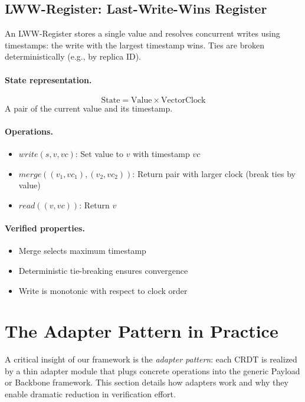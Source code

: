 \subsection{LWW-Register: Last-Write-Wins Register}

An LWW-Register stores a single value and resolves concurrent writes using timestamps: the write with the largest timestamp wins. Ties are broken deterministically (e.g., by replica ID).

\paragraph{State representation.}
\[
\text{State} = \text{Value} \times \text{VectorClock}
\]
A pair of the current value and its timestamp.

\paragraph{Operations.}
\begin{itemize}
  \item $\mathit{write}(s, v, vc)$: Set value to $v$ with timestamp $vc$
  \item $\mathit{merge}((v_1, vc_1), (v_2, vc_2))$: Return pair with larger clock (break ties by value)
  \item $\mathit{read}((v, vc))$: Return $v$
\end{itemize}

\paragraph{Verified properties.}
\begin{itemize}
  \item Merge selects maximum timestamp
  \item Deterministic tie-breaking ensures convergence
  \item Write is monotonic with respect to clock order
\end{itemize}

\section{The Adapter Pattern in Practice}\label{sec:adapter-pattern-details}

A critical insight of our framework is the \emph{adapter pattern}: each CRDT is realized by a thin adapter module that plugs concrete operations into the generic Payload or Backbone framework. This section details how adapters work and why they enable dramatic reduction in verification effort.

